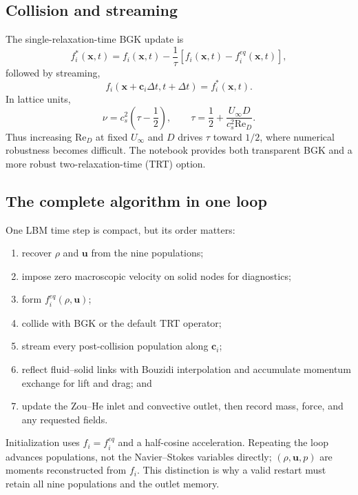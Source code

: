 \documentclass[11pt]{article}
\newcommand{\Rey}{\mathrm{Re}}
\begin{document}
\subsection{Collision and streaming}
The single-relaxation-time BGK update is
\begin{equation}
f_i^*(\bm{x},t)=f_i(\bm{x},t)-\frac{1}{\tau}\left[f_i(\bm{x},t)-f_i^{eq}(\bm{x},t)\right],
\end{equation}
followed by streaming,
\begin{equation}
f_i(\bm{x}+\bm{c}_i\Delta t,t+\Delta t)=f_i^*(\bm{x},t).
\end{equation}
In lattice units,
\begin{equation}
\nu=c_s^2\left(\tau-\frac12\right),\qquad
\tau=\frac12+\frac{U_\infty D}{c_s^2\Rey_D}.
\end{equation}
Thus increasing $\Rey_D$ at fixed $U_\infty$ and $D$ drives $\tau$ toward $1/2$, where numerical robustness becomes difficult. The notebook provides both transparent BGK and a more robust two-relaxation-time (TRT) option.

\subsection{The complete algorithm in one loop}
One LBM time step is compact, but its order matters:
\begin{enumerate}
\item recover $\rho$ and $\bm u$ from the nine populations;
\item impose zero macroscopic velocity on solid nodes for diagnostics;
\item form $f_i^{eq}(\rho,\bm u)$;
\item collide with BGK or the default TRT operator;
\item stream every post-collision population along $\bm c_i$;
\item reflect fluid--solid links with Bouzidi interpolation and accumulate
momentum exchange for lift and drag; and
\item update the Zou--He inlet and convective outlet, then record mass, force,
and any requested fields.
\end{enumerate}
Initialization uses $f_i=f_i^{eq}$ and a half-cosine acceleration.  Repeating
the loop advances populations, not the Navier--Stokes variables directly;
$(\rho,\bm u,p)$ are moments reconstructed from $f_i$. This distinction is why
a valid restart must retain all nine populations and the outlet memory.
\end{document}
